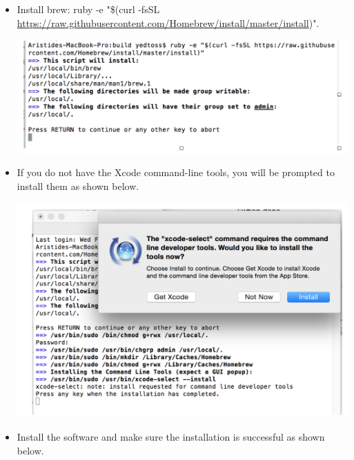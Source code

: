 \documentclass[12pt]{article}
\begin{document}
\begin{itemize}
	\item Install brew: {ruby -e \color{blue} "\$(curl -fsSL \url{https://raw.githubusercontent.com/Homebrew/install/master/install})}".
	
	\vspace{\abovedisplayskip}
	\begin{minipage}{\linewidth}
		\centering
		\includegraphics[scale=0.75]{img/5}
	\end{minipage}
	\vspace{\belowdisplayskip}
	
	\item If you do not have the Xcode command-line tools, you will be prompted to install them as shown below.
	
	\vspace{\abovedisplayskip}
	\begin{minipage}{\linewidth}
		\centering
		\includegraphics[scale=0.75]{img/6}
	\end{minipage}
	\vspace{\belowdisplayskip}
	
	\item Install the software and make sure the installation is successful as shown below.
	

\end{itemize}
\end{document}
